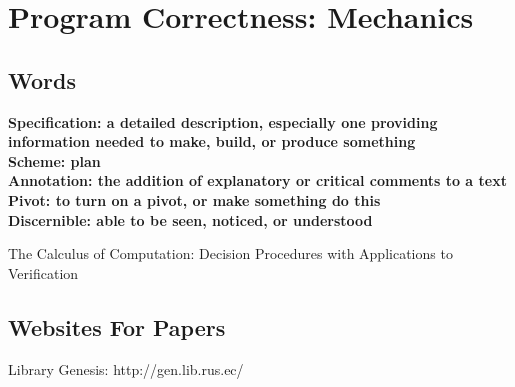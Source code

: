 \documentclass{article}
\begin{document}
\section{Program Correctness: Mechanics}
\subsection{Words}
\textbf{Specification: a detailed description, especially one providing information needed to make, build, or produce something}\\
\textbf{Scheme: plan}\\
\textbf{Annotation: the addition of explanatory or critical comments to a text}\\
\textbf{Pivot: to turn on a pivot, or make something do this}\\
\textbf{Discernible: able to be seen, noticed, or understood}\\
 

\newpage
\begin{thebibliography}{1}
    The Calculus of Computation: Decision Procedures with Applications to Verification
\end{thebibliography}

\begin{appendix}
    \section{Websites For Papers}Library Genesis: http://gen.lib.rus.ec/
\end{appendix}
\end{document}
